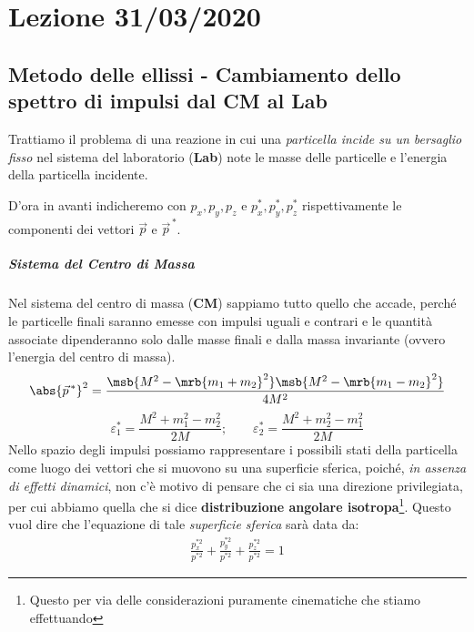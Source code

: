 \chapter{Lezione 31/03/2020}

\section{Metodo delle ellissi - Cambiamento dello spettro di impulsi dal CM al
  Lab}
Trattiamo il problema di una reazione in cui una \textit{particella incide su
	un bersaglio fisso} nel sistema del laboratorio (\textbf{Lab}) note le masse
delle particelle e l'energia della particella incidente.

\begin{note}[]
	D'ora in avanti indicheremo con $p_x, p_y, p_z$ e $p_x^\ast, p_y^\ast,
		p_z^\ast$ rispettivamente le componenti dei vettori $\vec{p}$ e
	$\vec{p}^{\,\ast}$.
\end{note}

\paragraph{Sistema del Centro di Massa}
Nel sistema del centro di massa (\textbf{CM}) sappiamo tutto quello che accade,
perché le particelle finali saranno emesse con impulsi uguali e contrari e le
quantità associate dipenderanno solo dalle masse finali e dalla massa
invariante (ovvero l'energia del centro di massa).
\begin{equation}
	\abs{\vec{p}^{\,\ast}}^{2} = \frac{\msb{M^2 - \mrb{m_1 + m_2}^2} \msb{M^2 -
			\mrb{m_1 - m_2}^2}}{4 M^2}
\end{equation}
\begin{equation}
	\varepsilon_1^\ast = \frac{M^2 + m_1^2 - m_2^2}{2 M};
	\qquad
	\varepsilon_2^\ast = \frac{M^2 + m_2^2 - m_1^2}{2 M}
\end{equation}
Nello spazio degli impulsi possiamo rappresentare i possibili stati della
particella come luogo dei vettori che si muovono su una superficie sferica,
poiché, \textit{in assenza di effetti dinamici}, non c'è motivo di pensare che
ci sia una direzione privilegiata, per cui abbiamo quella che si dice
\textbf{distribuzione angolare isotropa}\footnote{
	Questo per via delle considerazioni puramente cinematiche che stiamo
	effettuando
}.
Questo vuol dire che l'equazione di tale \textit{superficie sferica} sarà data
da:
\begin{align}
	\boxed{\frac{p_x^{\ast 2}}{p^{\ast2}} + \frac{p_y^{\ast2}}{p^{\ast2}} +
	\frac{p_z^{\ast2}}{p^{\ast2}} = 1}
\end{align}

